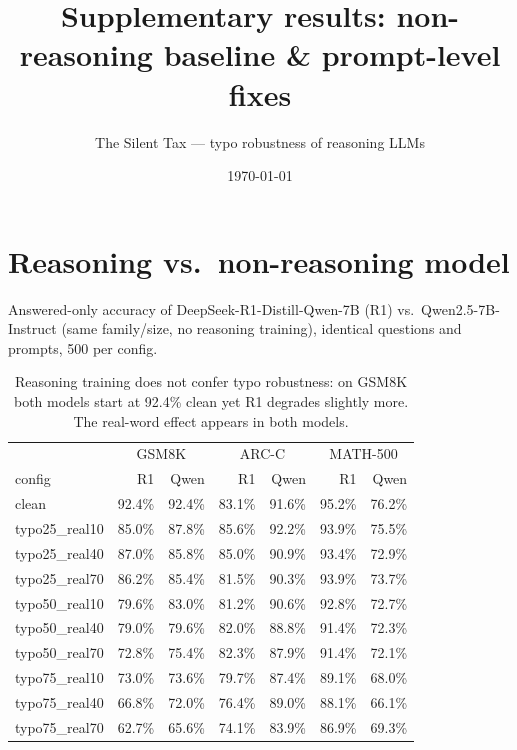 \documentclass[11pt]{article}
\title{Supplementary results: non-reasoning baseline \& prompt-level fixes}
\author{The Silent Tax --- typo robustness of reasoning LLMs}
\date{\today}
\begin{document}
\maketitle

\section{Reasoning vs.\ non-reasoning model}
Answered-only accuracy of DeepSeek-R1-Distill-Qwen-7B (R1) vs.\ Qwen2.5-7B-Instruct
(same family/size, no reasoning training), identical questions and prompts, 500 per config.

\begin{table}[h]\centering\small
\begin{tabular}{l rr rr rr}
\toprule
 & \multicolumn{2}{c}{GSM8K} & \multicolumn{2}{c}{ARC-C} & \multicolumn{2}{c}{MATH-500} \\
config & R1 & Qwen & R1 & Qwen & R1 & Qwen \\
\midrule
clean & 92.4\% & 92.4\% & 83.1\% & 91.6\% & 95.2\% & 76.2\% \\
typo25\_real10 & 85.0\% & 87.8\% & 85.6\% & 92.2\% & 93.9\% & 75.5\% \\
typo25\_real40 & 87.0\% & 85.8\% & 85.0\% & 90.9\% & 93.4\% & 72.9\% \\
typo25\_real70 & 86.2\% & 85.4\% & 81.5\% & 90.3\% & 93.9\% & 73.7\% \\
typo50\_real10 & 79.6\% & 83.0\% & 81.2\% & 90.6\% & 92.8\% & 72.7\% \\
typo50\_real40 & 79.0\% & 79.6\% & 82.0\% & 88.8\% & 91.4\% & 72.3\% \\
typo50\_real70 & 72.8\% & 75.4\% & 82.3\% & 87.9\% & 91.4\% & 72.1\% \\
typo75\_real10 & 73.0\% & 73.6\% & 79.7\% & 87.4\% & 89.1\% & 68.0\% \\
typo75\_real40 & 66.8\% & 72.0\% & 76.4\% & 89.0\% & 88.1\% & 66.1\% \\
typo75\_real70 & 62.7\% & 65.6\% & 74.1\% & 83.9\% & 86.9\% & 69.3\% \\
\bottomrule
\end{tabular}
\caption{Reasoning training does not confer typo robustness: on GSM8K both models start
at 92.4\% clean yet R1 degrades slightly more. The real-word effect appears in both models.}
\end{table}
\end{document}
